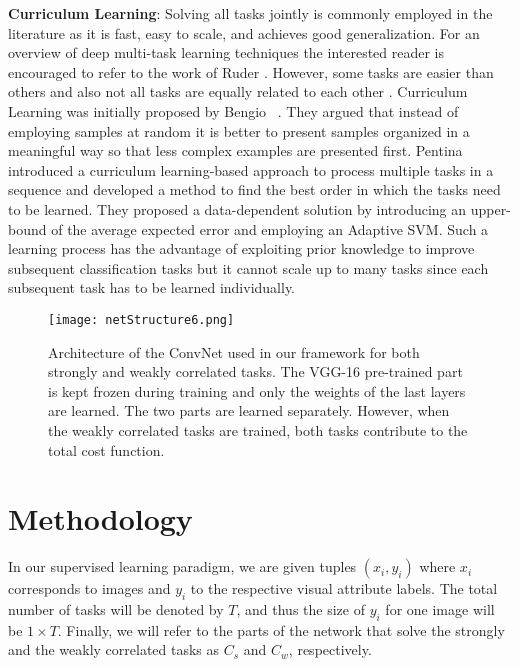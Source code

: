 \documentclass[10pt,twocolumn,letterpaper]{article}
\begin{document}
	\noindent\textbf{Curriculum Learning}: Solving all tasks jointly is commonly employed in the literature \cite{ciregan2012multi, hand2016attributes, zhu2015multi} as it is fast, easy to scale, and achieves good generalization. For an overview of deep multi-task learning techniques the interested reader is encouraged to refer to the work of Ruder \cite{ruder2017overview}. However, some tasks are easier than others and also not all tasks are equally related to each other \cite{pentina2015curriculum}. Curriculum Learning was initially proposed by Bengio \etal~\cite{bengio2009curriculum}. They argued that instead of employing samples at random it is better to present samples organized in a meaningful way so that less complex examples are presented first. Pentina \etal~\cite{pentina2015curriculum} introduced a curriculum learning-based approach to process multiple tasks in a sequence and developed a method to find the best order in which the tasks need to be learned. They proposed a data-dependent solution by introducing an upper-bound of the average expected error and employing an Adaptive SVM. Such a learning process has the advantage of exploiting prior knowledge to improve subsequent classification tasks but it cannot scale up to many tasks since each subsequent task has to be learned individually. 
	
	\begin{figure*}[t] 
		\centering
		\texttt{[image: netStructure6.png]}
		\caption{Architecture of the ConvNet used in our framework for both strongly and weakly correlated tasks. The VGG-16 pre-trained part is kept frozen during training and only the weights of the last layers are learned. The two parts are learned separately. However, when the weakly correlated tasks are trained, both tasks contribute to the total cost function.}
		\label{fig:Method}
	\end{figure*}
	
	\section{Methodology}
	In our supervised learning paradigm, we are given tuples \((x_i,y_i)\) where \(x_i\) corresponds to images and \(y_i\) to the respective visual attribute labels. The total number of tasks will be denoted by \(T\), and thus the size of \(y_i\) for one image will be \(1\times T\). Finally, we will refer to the parts of the network that solve the strongly and the weakly correlated tasks as \(C_s\) and \(C_w\), respectively. 
	
\end{document}
